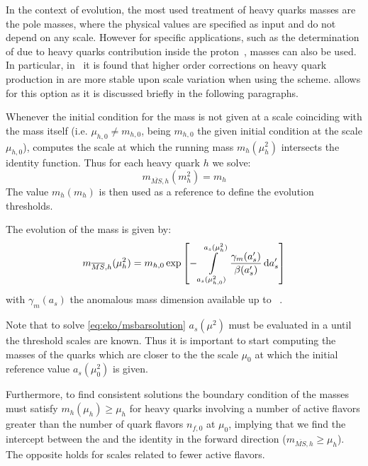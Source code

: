 In the context of \pdf{} evolution, the most used treatment of heavy quarks masses are the pole masses,
where the physical values are specified as input and do not depend on any scale.
However for specific applications, such as the determination of \mhou{} due to heavy quarks contribution 
inside the proton~\cite{Ball:2016neh}, \msbar{} masses can also be used.
In particular, in~\cite{Alekhin:2010sv} it is found that higher order corrections on heavy quark production
in \dis{} are more stable upon scale variation when using the \msbar{} scheme.
\eko{} allows for this option as it is discussed briefly in the following paragraphs.

Whenever the initial condition for the mass is not given at a scale coinciding with
the mass itself (i.e. $\mu_{h,0} \neq m_{h,0}$, being $m_{h,0}$ the given initial condition
at the scale $\mu_{h,0}$),
\eko{} computes the scale at which the running mass $m_{h}(\mu_h^2)$ intersects
the identity function.
Thus for each heavy quark $h$ we solve:
%
\begin{equation}
    m_{\overline{MS},h}(m_h^2) = m_h
\end{equation}
The value $m_h(m_h)$ is then used as a reference to define the evolution thresholds.

The evolution of the \msbar{} mass is given by:
%
\begin{equation}
    m_{\overline{MS},h}(\mu_h^2) = m_{h,0} \exp\qty[ - \int\limits_{a_s(\mu_{h,0}^2)}^{a_s(\mu_h^2)} \frac{\gamma_m(a_s')}{\beta(a_s')} \dd{a_s'} ]
    \label{eq:eko/msbarsolution}
\end{equation}
%
with $\gamma_m(a_s)$ the \qcd{} anomalous mass dimension available up to 
\nnnlo{}~\cite{Vermaseren:1997fq,Schroder:2005hy,Chetyrkin:2005ia}.

Note that to solve \cref{eq:eko/msbarsolution} $a_s(\mu^2)$ must be evaluated in 
a \ffns{} until the threshold scales are known. Thus it is important
to start computing the \msbar{} masses of the quarks which are closer to the
the scale $\mu_{0}$ at which the initial reference value $a_s(\mu_{0}^2)$ is given. 

Furthermore, to find consistent solutions the boundary condition of the
\msbar{} masses must satisfy $m_h(\mu_h) \ge \mu_h$ for heavy quarks involving
a number of active flavors greater than the number of quark flavors $n_{f,0}$ at $\mu_{0}$, implying that we find
the intercept between the \rge{} and the identity in the forward direction ($m_{\overline{MS},h} \ge \mu_h$).
The opposite holds for scales related to fewer active flavors.
